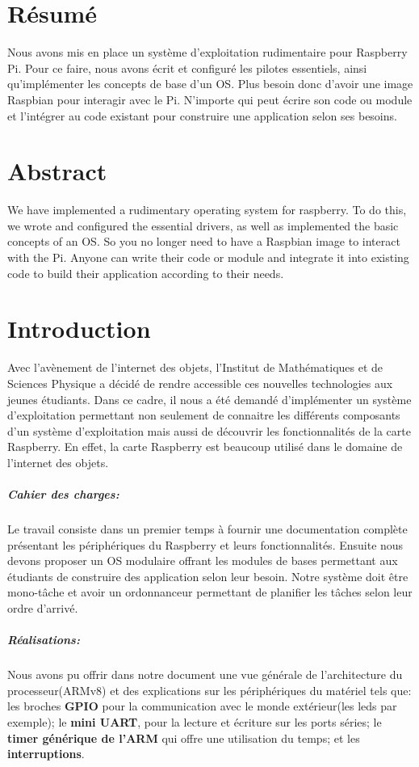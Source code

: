 \documentclass[12pt,a4paper,oneside]{book}
\begin{document}
	
	\chapter{Résumé}
	Nous avons mis en place un système d'exploitation rudimentaire pour Raspberry Pi. Pour ce faire, nous avons écrit et configuré les pilotes essentiels, ainsi qu'implémenter les concepts de base d'un OS. Plus besoin donc d'avoir une image Raspbian pour interagir avec le Pi. N'importe qui peut écrire son code ou module et l'intégrer au code existant pour construire une application selon ses besoins.
	\chapter{Abstract}
	We have implemented a rudimentary operating system for raspberry. To do this, we wrote and configured the essential drivers, as well as implemented the basic concepts of an OS. So you no longer need to have a Raspbian image to interact with the Pi. Anyone can write their code or module and integrate it into existing code to build their application according to their needs.
	\chapter{Introduction}
	Avec l'avènement de l'internet des objets, l'Institut de Mathématiques et de Sciences Physique a décidé de rendre accessible ces nouvelles technologies aux jeunes étudiants. Dans ce cadre, il nous a été demandé d'implémenter un système d'exploitation permettant non seulement de connaitre les différents composants d'un système d'exploitation mais aussi de découvrir les fonctionnalités de la carte Raspberry. En effet, la carte Raspberry est beaucoup utilisé dans le domaine de l'internet des objets.
	
	\paragraph{Cahier des charges:} Le travail consiste dans un premier temps à fournir une documentation complète présentant les périphériques du Raspberry et leurs fonctionnalités. Ensuite nous devons proposer un OS modulaire offrant les modules de bases permettant aux étudiants de construire des application selon leur besoin. Notre système doit être mono-tâche et avoir un ordonnanceur permettant de planifier les tâches selon leur ordre d'arrivé.
	
	\paragraph{Réalisations:} Nous avons pu offrir dans notre document une vue générale de l'architecture du processeur(ARMv8) et des explications sur les périphériques du matériel tels que: les broches \textbf{GPIO} pour la communication avec le monde extérieur(les leds par exemple); le \textbf{mini UART}, pour la lecture et écriture sur les ports séries; le \textbf{timer générique de l'ARM} qui offre une utilisation du temps; et les \textbf{interruptions}.
	
\end{document}
